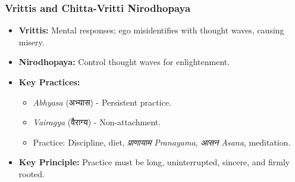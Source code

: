 
\begin{frame}[fragile]\frametitle{Vrittis and Chitta-Vritti Nirodhopaya} 
	\begin{itemize} 
	\item \textbf{Vrittis:} Mental responses; ego misidentifies with thought waves, causing misery. 
	\item \textbf{Nirodhopaya:} Control thought waves for enlightenment. 
	\item \textbf{Key Practices:} 
		\begin{itemize} 
			\item \textit{Abhyasa} (अभ्यास) - Persistent practice. 
			\item \textit{Vairagya} (वैराग्य) - Non-attachment. 
			\item Practice: Discipline, diet, \textit{प्राणायाम Pranayama}, \textit{आसन Asana}, meditation. 
		\end{itemize} 
	\item \textbf{Key Principle:} Practice must be long, uninterrupted, sincere, and firmly rooted. 
	\end{itemize} 
\end{frame}

